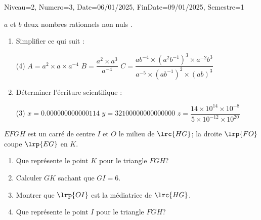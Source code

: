 \documentclass[a4paper,12pt]{article}
\begin{document}
\begin{Maquette}[DM]{Niveau=2, Numero=3, Date=06/01/2025, FinDate=09/01/2025, Semestre=1}
\begin{exercice}
$a$ et $b$ deux nombres rationnels non nuls .
\begin{enumerate}
\item Simplifier ce qui suit :

\begin{tasks}[style=itemize](4)
\task $A=a^{2}\times a \times a^{-4} $ 
\task $B=\dfrac{a^{2}\times a^{3}}{a^{-4}}$
\task* $C=\dfrac{ab^{-4}\times (a^{2}b^{-1})^{3}\times a^{-2}b^{3}}{a^{-5}\times (ab^{-1})^{2}\times (ab)^{3}}$
\end{tasks}
\item Déterminer l'écriture scientifique : 

\begin{tasks}[style=itemize](3)
\task $x=0.000000000000114$
\task $y=32100000000000000$
\task $z=\dfrac{14\times 10^{14}\times 10^{-8}}{5\times 10^{-12}\times 10^{20}}$
\end{tasks}

\end{enumerate}
\end{exercice}
\begin{exercice}
$EFGH$ est un carré de centre $I$ et $O$ le milieu de $\lrc{HG}$; la droite $\lrp{FO}$ coupe $\lrp{EG}$ en $K$.
\begin{minipage}{0.55\linewidth}
\begin{enumerate}
\item Que représente le point $K$ pour le triangle $FGH$?
\item Calculer $GK$ sachant que $GI=6$.
\item Montrer que $\lrp{OI}$ est la médiatrice de $\lrc{HG}$.
\item Que représente le point $I$ pour le triangle $FGH$?
\end{enumerate}
\end{minipage}%
\begin{minipage}{0.45\linewidth}
\begin{center}
\end{center}
\end{minipage}
\end{exercice}

\end{Maquette}
\end{document}
